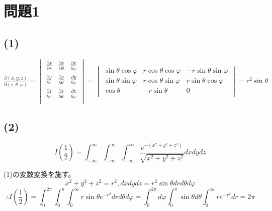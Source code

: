 \documentclass[]{jsarticle}
\begin{document}
\section*{問題1}
    \subsection*{(1)}
        $
            \displaystyle\frac{\partial (x, y, z)}{\partial (r, \theta, \varphi)} =
            \begin{vmatrix}
                \displaystyle\frac{\partial x}{\partial r} & \displaystyle\frac{\partial x}{\partial \theta} & \displaystyle\frac{\partial x}{\partial \varphi} \\
                \displaystyle\frac{\partial y}{\partial r} & \displaystyle\frac{\partial y}{\partial \theta} & \displaystyle\frac{\partial y}{\partial \varphi} \\
                \displaystyle\frac{\partial z}{\partial r} & \displaystyle\frac{\partial z}{\partial \theta} & \displaystyle\frac{\partial z}{\partial \varphi} \\
            \end{vmatrix} =
            \begin{vmatrix}
                \sin\theta\cos\varphi & r\cos\theta\cos\varphi & -r\sin\theta\sin\varphi \\
                \sin\theta\sin\varphi & r\cos\theta\sin\varphi & r\sin\theta\cos\varphi \\
                \cos\theta & -r\sin\theta & 0 \\
            \end{vmatrix} = r^2\sin\theta
        $
    \subsection*{(2)}
        \begin{equation*}
            I\left(\frac{1}{2}\right) =
            \int^\infty_{-\infty}\int^\infty_{-\infty}\int^\infty_{-\infty}\frac{e^{-(x^2 + y^2 + z^2)}}{\sqrt{x^2 + y^2 + z^2}}dxdydz
        \end{equation*}

        (1)の変数変換を施す。
        \begin{equation*}
            x^2 + y^2 + z^2 = r^2, dxdydz=r^2\sin\theta drd\theta d\varphi
        \end{equation*}
        \begin{equation*}
            \therefore I\left(\frac{1}{2}\right) =
            \int^{2\pi}_0\int^\pi_0\int^\infty_0r\sin\theta e^{-r^2}drd\theta d\varphi =
            \int^{2\pi}_0d\varphi\int^\pi_0\sin\theta d\theta\int^\infty_0re^{-r^2}dr =
            2\pi
        \end{equation*}
\end{document}
